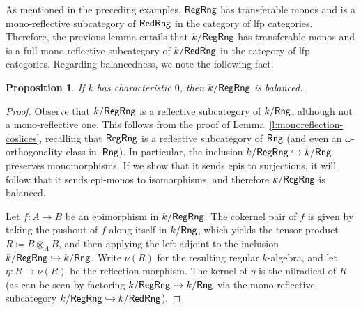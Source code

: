 \documentclass[a4paper,10pt,reqno]{amsart}
\newtheorem{proposition}[theorem]{Proposition}
\theoremstyle{definition}
\theoremstyle{remark}
\newcommand{\Rng}{{\sf Rng}}								%
\newcommand{\RegRng}{{\sf RegRng}}						%
\newcommand{\RedRng}{{\sf RedRng}}						%
\newcommand{\into}{\hookrightarrow}						%
\begin{document}
As mentioned in the preceding examples, $\RegRng$ has transferable monos and is a mono-reflective subcategory of $\RedRng$ in the category of lfp categories.
Therefore, the previous lemma entails that $k/\RegRng$ has transferable monos and is a full mono-reflective subcategory of $k/\RedRng$ in the category of lfp categories. Regarding balancedness, we note the following fact.

\begin{proposition}
If $k$ has characteristic $0$, then $k/\RegRng$ is balanced.
\end{proposition}

\begin{proof}
Observe that $k/\RegRng$ is a reflective subcategory of $k/\Rng$, although not a mono-reflective one. This follows from the proof of Lemma~\ref{l:monoreflection-coslices}, recalling that $\RegRng$ is a reflective subcategory of $\Rng$ (and even an $\omega$-orthogonality class in~$\Rng$). In particular, the inclusion $k/\RegRng\into k/\Rng$ preserves monomorphisms. If we show that it sends epis to surjections, it will follow that it sends epi-monos to isomorphisms, and therefore $k/\RegRng$ is balanced.

Let $f\colon A \to B$ be an epimorphism in $k/\RegRng$. The cokernel pair of $f$ is given by taking the pushout of $f$ along itself in $k/\Rng$, which yields the tensor product $R\coloneqq B\otimes_{A} B$, and then applying the left adjoint to the inclusion $k/\RegRng \into k/\Rng$. Write $\nu(R)$ for the resulting regular $k$-algebra, and let $\eta\colon R \to \nu(R)$ be the reflection morphism. The kernel of $\eta$ is the nilradical of $R$ (as can be seen by factoring $k/\RegRng \into k/\Rng$ via the mono-reflective subcategory $k/\RegRng \into k/\RedRng$). 


\end{proof}
\end{document}
